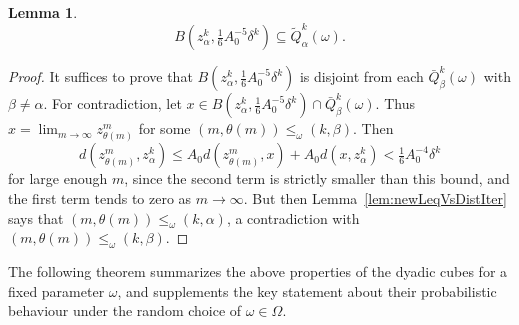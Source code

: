 \documentclass{amsart}
\numberwithin{equation}{section}
\theoremstyle{plain}
\newtheorem{lemma}[equation]{Lemma}
\theoremstyle{definition}
\theoremstyle{remark}
\begin{document}
{{\begin{lemma}\label{lem:containedBall}
\begin{equation*}
  B(z^k_\alpha,\tfrac16 A_0^{-5}\delta^k)\subseteq\tilde{Q}^k_\alpha(\omega).
\end{equation*}
\end{lemma}

\begin{proof}
It suffices to prove that $B(z^k_\alpha,\tfrac16 A_0^{-5}\delta^k)$ is disjoint from each $\bar{Q}^k_\beta(\omega)$ with $\beta\neq\alpha$. For contradiction, let $x\in B(z^k_\alpha,\tfrac16 A_0^{-5}\delta^k)\cap\bar{Q}^k_\beta(\omega)$. Thus $x=\lim_{m\to\infty}z^m_{\theta(m)}$ for some $(m,\theta(m))\leq_\omega(k,\beta)$. Then
\begin{equation*}
  d(z^m_{\theta(m)},z^k_\alpha)
  \leq A_0 d(z^m_{\theta(m)},x)+A_0 d(x,z^k_\alpha)<\tfrac16A_0^{-4}\delta^k
\end{equation*}
for large enough $m$, since the second term is strictly smaller than this bound, and the first term tends to zero as $m\to\infty$. But then Lemma~\ref{lem:newLeqVsDistIter} says that $(m,\theta(m))\leq_\omega(k,\alpha)$, a contradiction with $(m,\theta(m))\leq_\omega(k,\beta)$.
\end{proof}

The following theorem summarizes the above properties of the dyadic cubes for a fixed parameter $\omega$, and supplements the key statement about their probabilistic behaviour under the random choice of $\omega\in\Omega$.

}}
\end{document}
